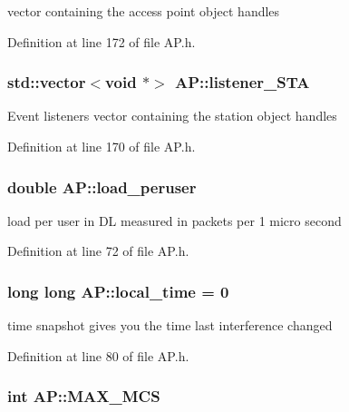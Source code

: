 vector containing the access point object handles 



Definition at line 172 of file A\-P.\-h.

\hypertarget{classAP_af0d74685fc274f17734ee022b64d9931}{
\subsubsection[{listener\-\_\-\-S\-T\-A}]{\setlength{\rightskip}{0pt plus 5cm}std\-::vector$<$void $\ast$$>$ A\-P\-::listener\-\_\-\-S\-T\-A}}\label{classAP_af0d74685fc274f17734ee022b64d9931}
Event listeners vector containing the station object handles 

Definition at line 170 of file A\-P.\-h.

\hypertarget{classAP_a3e8b289d2aa54fd8898e145fc605907b}{
\subsubsection[{load\-\_\-peruser}]{\setlength{\rightskip}{0pt plus 5cm}double A\-P\-::load\-\_\-peruser\hspace{0.3cm}{\ttfamily [private]}}}\label{classAP_a3e8b289d2aa54fd8898e145fc605907b}


load per user in D\-L measured in packets per 1 micro second 



Definition at line 72 of file A\-P.\-h.

\hypertarget{classAP_ab31a52cd05ca5daf9ccd5d24941fe395}{
\subsubsection[{local\-\_\-time}]{\setlength{\rightskip}{0pt plus 5cm}long long A\-P\-::local\-\_\-time = 0\hspace{0.3cm}{\ttfamily [private]}}}\label{classAP_ab31a52cd05ca5daf9ccd5d24941fe395}


time snapshot gives you the time last interference changed 



Definition at line 80 of file A\-P.\-h.

\hypertarget{classAP_a1fe0d98f0db9557f18e560f8bc96c2fc}{
\subsubsection[{M\-A\-X\-\_\-\-M\-C\-S}]{\setlength{\rightskip}{0pt plus 5cm}int A\-P\-::\-M\-A\-X\-\_\-\-M\-C\-S}}\label{classAP_a1fe0d98f0db9557f18e560f8bc96c2fc}


